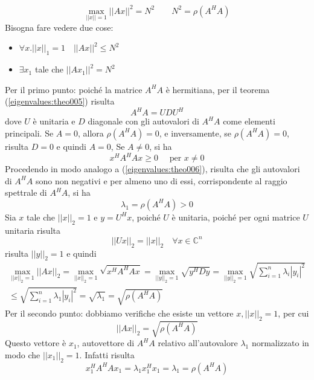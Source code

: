 \begin{thproof}
$$ \max_{||x|| =1} || Ax||^{2} = N^{2} \qquad N^{2} = \rho(A^{H}A)$$
Bisogna fare vedere due cose:
\begin{itemize}
 \item $ \forall x. ||x||_{1} = 1 \quad  || Ax||^{2} \leq N^{2} $
 \item  $\exists x_1$ tale che $ ||Ax_{1} ||^{2} = N^{2} $
\end{itemize}
Per il primo punto: poich\'e la matrice $A^{H}A$ \`e hermitiana,
per il teorema (\ref{eigenvalues:theo005}) risulta
$$ A^{H}A = UDU^{H}$$
dove $U$ \`e unitaria e $D$ diagonale con gli autovalori di $A^{H}A$ come
elementi principali. Se $A = 0$, allora $\rho(A^{H}A)=0$, e inversamente, se
$\rho(A^{H}A)=0$, risulta $D=0$ e quindi $A=0$, Se $A \neq 0$, si ha
$$ x^{H}A^{H}Ax \geq 0 \quad \text{ per } x \neq 0$$
Procedendo in modo analogo a (\ref{eigenvalues:theo006}), risulta che
gli autovalori di $A^{H}A$ sono non negativi e per almeno uno di essi,
corrispondente al raggio spettrale di $A^{H}A$, si ha
$$\lambda_1 = \rho(A^{H}A)> 0$$
Sia $x$ tale che $||x||_{2}=1$ e $y=U^{H}x$, poich\'e $U$ \`e unitaria, 
poich\'e per ogni matrice $U$ unitaria risulta
$$ ||Ux||_{2} = ||x||_2 \quad \forall x \in \mathbb{C}^{n}$$
risulta $||y||_{2} = 1$ e quindi
$$ 
\begin{array}{c}
\displaystyle \max_{||x||_{2}=1} ||Ax||_{2} = 
 \displaystyle \max_{||x||_{2}=1} \sqrt{x^{H}A^{H}Ax} = 
 \displaystyle \max_{||y||_{2}=1} \sqrt{y^{H}Dy} = 
 \displaystyle \max_{||y||_{2}=1} \sqrt{
 \displaystyle \sum_{i=1}^{n} \lambda_i |y_i|^{2}} \\
\leq
 \displaystyle \sqrt{\sum_{i=1}^{n} \lambda_1 |y_i|^{2}}
 = 
\sqrt{\lambda_1} = \sqrt{\rho(A^{H}A)} 
\end{array}
$$
Per il secondo punto: dobbiamo verifiche che esiste un vettore
$x, ||x||_{2} = 1$, per cui
$$ ||Ax||_{2} = \sqrt{\rho(A^{H}A)}$$
Questo vettore \`e $x_1$, autovettore di $A^{H}A$ relativo all'autovalore
$\lambda_1$ normalizzato in modo che $||x_1||_{2}=1$. Infatti
risulta 
$$x_1^{H}A^{H}Ax_1 = \lambda_1 x_1^{H}x_1 = \lambda_1 = \rho(A^{H}A)$$
\end{thproof}

\outbpdocument
